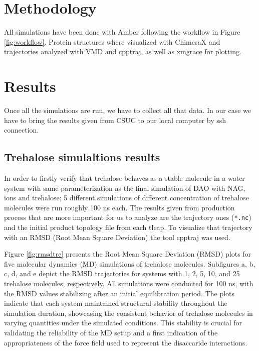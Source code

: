 \documentclass[a4paper]{article}
\begin{document}
\section{Methodology}

All simulations have been done with Amber following the workflow in Figure \ref{fig:workflow}.  Protein structures where visualized with ChimeraX \cite{Chimerax} and trajectories analyzed with  VMD\cite{HUMP96} and cpptraj\cite{roe_ptraj_2013}, as well as xmgrace\cite{turner_xmgrace_2005} for plotting.

	\section{Results}
	\label{sec:results}

Once all the simulations are run, we have to collect all that data. In our case we have to bring the results given from CSUC to our local computer by ssh connection. 


\subsection{Trehalose simulaltions results}

In order to firstly verify that trehalose behaves as a stable molecule in a water system with same parameterization as the final simulation of DAO with NAG, ions and trehalose; 5 different simulations of different concentration of trehalose molecules were run roughly 100 ns each. The results given from production process that are more important for us to analyze are the trajectory ones (\texttt{*.nc}) and the initial product topology file from each tleap. To visualize that trajectory with an RMSD (Root Mean Square Deviation) the tool cpptraj was used. 



Figure \ref{fig:rmsdtre} presents the Root Mean Square Deviation (RMSD) plots for five molecular dynamics (MD) simulations of trehalose molecules. Subfigures a, b, c, d, and e depict the RMSD trajectories for systems with 1, 2, 5, 10, and 25 trehalose molecules, respectively. All simulations were conducted for 100 ns, with the RMSD values stabilizing after an initial equilibration period. The plots indicate that each system maintained structural stability throughout the simulation duration, showcasing the consistent behavior of trehalose molecules in varying quantities under the simulated conditions. This stability is crucial for validating the reliability of the MD setup and a first indication of the appropriateness of the force field used to represent the disaccaride interactions.
\end{document}
